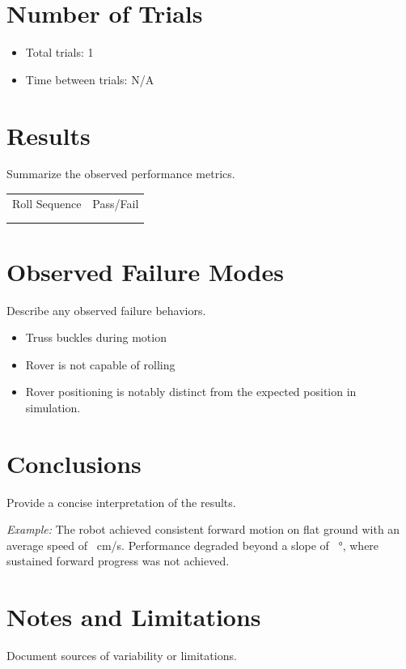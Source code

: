 \documentclass[11pt]{article}
\begin{document}
\section*{Number of Trials}
\begin{itemize}[noitemsep]
    \item Total trials: 1
    \item Time between trials: N/A
\end{itemize}

\section*{Results}
Summarize the observed performance metrics.

\begin{center}
\begin{tabular}{lc}
\toprule
Roll Sequence& Pass/Fail\\
 &\\
\midrule
&  \\
\end{tabular}
\end{center}

\section*{Observed Failure Modes}
Describe any observed failure behaviors.

\begin{itemize}[noitemsep]
    \item Truss buckles during motion
    \item Rover is not capable of rolling
    \item Rover positioning is notably distinct from the expected position in simulation.
\end{itemize}

\section*{Conclusions}
Provide a concise interpretation of the results.

\textit{Example:} The robot achieved consistent forward motion on flat ground with an average speed of \underline{\hspace{1 cm}}~cm/s. Performance degraded beyond a slope of \underline{\hspace{1 cm}}~\si{\degree}, where sustained forward progress was not achieved.

\section*{Notes and Limitations}
Document sources of variability or limitations.
\end{document}
